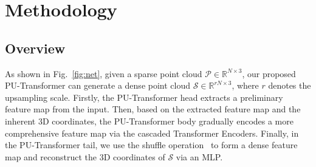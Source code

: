 \section{Methodology}
\label{sec:metho}
\subsection{Overview}
As shown in Fig.~\ref{fig:net}, given a sparse point cloud $\mathcal{P}\in\mathbb{R}^{N\times3}$, our proposed PU-Transformer can generate a dense point cloud $\mathcal{S}\in\mathbb{R}^{rN\times3}$, where $r$ denotes the upsampling scale. Firstly, the PU-Transformer head extracts a preliminary feature map from the input. Then, based on the extracted feature map and the inherent 3D coordinates, the PU-Transformer body gradually encodes a more comprehensive feature map via the cascaded Transformer Encoders. Finally, in the PU-Transformer tail, we use the shuffle operation~\cite{shi2016real} to form a dense feature map and reconstruct the 3D coordinates of $\mathcal{S}$ via an MLP.

